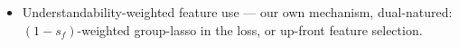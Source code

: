 \begin{itemize}
    \item Understandability-weighted feature use — our own mechanism, dual-natured: $(1{-}s_f)$-weighted group-lasso in the loss, or up-front feature selection. 

\end{itemize}
